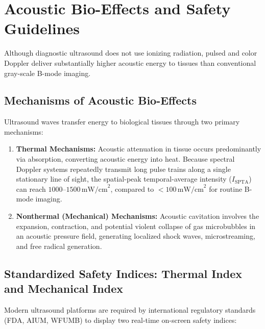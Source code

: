 \documentclass[11pt,a4paper]{article}
\begin{document}
\section{Acoustic Bio-Effects and Safety Guidelines}

Although diagnostic ultrasound does not use ionizing radiation, pulsed and color Doppler deliver substantially higher acoustic energy to tissues than conventional gray-scale B-mode imaging.

\subsection{Mechanisms of Acoustic Bio-Effects}

Ultrasound waves transfer energy to biological tissues through two primary mechanisms:
\begin{enumerate}[leftmargin=*]
    \item \textbf{Thermal Mechanisms:} Acoustic attenuation in tissue occurs predominantly via absorption, converting acoustic energy into heat. Because spectral Doppler systems repeatedly transmit long pulse trains along a single stationary line of sight, the spatial-peak temporal-average intensity ($I_{\text{SPTA}}$) can reach $1000\text{--}1500\,\text{mW/cm}^2$, compared to $< 100\,\text{mW/cm}^2$ for routine B-mode imaging.
    \item \textbf{Nonthermal (Mechanical) Mechanisms:} Acoustic cavitation involves the expansion, contraction, and potential violent collapse of gas microbubbles in an acoustic pressure field, generating localized shock waves, microstreaming, and free radical generation.
\end{enumerate}

\subsection{Standardized Safety Indices: Thermal Index and Mechanical Index}

Modern ultrasound platforms are required by international regulatory standards (FDA, AIUM, WFUMB) to display two real-time on-screen safety indices:
\end{document}
